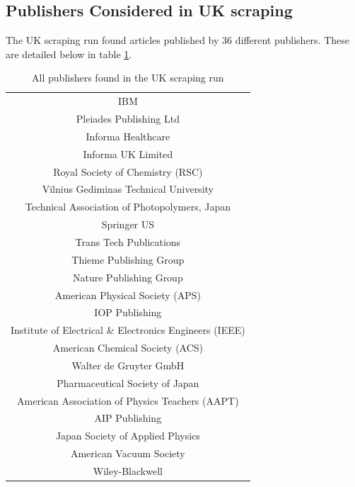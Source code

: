 \subsection{Publishers Considered in UK scraping}
The UK scraping run found articles published by 36 different publishers. These are detailed below in table \ref{tab:uk_publishers_table}.
\begin{table}[H]
\centering
\caption{All publishers found in the UK scraping run}
\label{tab:uk_publishers_table}
\begin{tabular}{||c||}
\hline 
IBM                                               \\
Pleiades Publishing Ltd                           \\
Informa Healthcare                                \\
Informa UK Limited                                \\
Royal Society of Chemistry (RSC)                  \\
Vilnius Gediminas Technical University            \\
Technical Association of Photopolymers, Japan     \\
Springer US                                       \\
Trans Tech Publications                           \\
Thieme Publishing Group                           \\
Nature Publishing Group                           \\
American Physical Society (APS)                   \\
IOP Publishing                                    \\
Institute of Electrical \& Electronics Engineers (IEEE)\\
American Chemical Society (ACS)                   \\
Walter de Gruyter GmbH                            \\
Pharmaceutical Society of Japan                   \\
American Association of Physics Teachers (AAPT)   \\
AIP Publishing                                    \\
Japan Society of Applied Physics                  \\
American Vacuum Society                           \\
Wiley-Blackwell                                   \\

\end{tabular}
\end{table}
